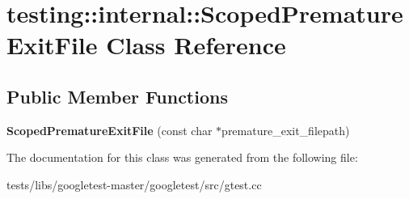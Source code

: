 \hypertarget{classtesting_1_1internal_1_1ScopedPrematureExitFile}{}\section{testing\+:\+:internal\+:\+:Scoped\+Premature\+Exit\+File Class Reference}
\label{classtesting_1_1internal_1_1ScopedPrematureExitFile}
\subsection*{Public Member Functions}
\begin{DoxyCompactItemize}
\item 
\mbox{\label{classtesting_1_1internal_1_1ScopedPrematureExitFile_ae520883b8a6984a864ce675acedff4a2}} 
{\bfseries Scoped\+Premature\+Exit\+File} (const char $\ast$premature\+\_\+exit\+\_\+filepath)
\end{DoxyCompactItemize}


The documentation for this class was generated from the following file\+:\begin{DoxyCompactItemize}
\item 
tests/libs/googletest-\/master/googletest/src/gtest.\+cc\end{DoxyCompactItemize}
